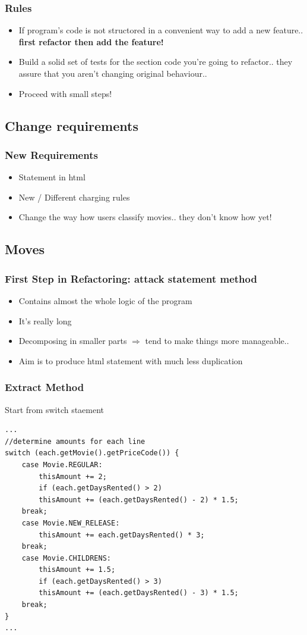 \documentclass{beamer}
\begin{document}
\begin{frame}
  \frametitle{Rules}
  \begin{itemize}
  	\item If program's code is not structored in a convenient way to add a new feature.. \textbf{first refactor then add the feature!}
  	\item  Build a solid set of tests for the section code you're going to refactor.. they assure that you aren't changing original behaviour.. 
  	\item Proceed with small steps!
    \end{itemize}
\end{frame}

\subsection{Change requirements}
\begin{frame}
  \frametitle{New Requirements}
  \begin{itemize}
  		\item Statement in html
		\item New / Different charging rules
		\item Change the way how users classify movies.. they don't know how yet!
  \end{itemize}
\end{frame}

\subsection{Moves}
\begin{frame}
  \frametitle{First Step in Refactoring: attack statement method}
   \begin{itemize}
  		\item Contains almost the whole logic of the program
		\item It's really long
		\item Decomposing in smaller parts $\Rightarrow$ tend to make things more manageable..
		\item Aim is to produce html statement with much less duplication
  \end{itemize}
\end{frame}

\begin{frame}[containsverbatim]
	\frametitle{Extract Method}
	Start from switch staement \\
	\begin{lstlisting}
...
//determine amounts for each line
switch (each.getMovie().getPriceCode()) {
	case Movie.REGULAR:
		thisAmount += 2;
		if (each.getDaysRented() > 2)
		thisAmount += (each.getDaysRented() - 2) * 1.5;
	break;
	case Movie.NEW_RELEASE:
		thisAmount += each.getDaysRented() * 3;
	break;
	case Movie.CHILDRENS:
		thisAmount += 1.5;
		if (each.getDaysRented() > 3)
		thisAmount += (each.getDaysRented() - 3) * 1.5;
	break;
}
...
\end{lstlisting}
\end{frame}
\end{document}
